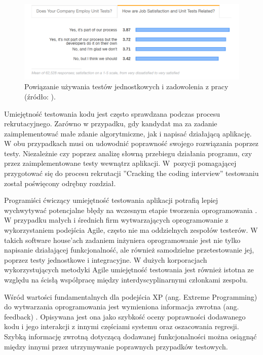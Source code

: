 \begin{figure}[h]
    \centering
    \includegraphics[width = 13cm]{chapter02/unit-tests-satisfaction.png}
    \caption{Powiązanie używania testów jednostkowych i zadowolenia z pracy (źródło: \cite{stack-overflow-survey}).}
    \label{fig:unit-tests-satisfaction}
\end{figure}

Umiejętność testowania kodu jest często sprawdzana podczas procesu rekrutacyjnego.
Zarówno w przypadku, gdy kandydat ma za zadanie zaimplementować małe zdanie algorytmiczne, jak i napisać działającą aplikację.
W obu przypadkach musi on udowodnić poprawność swojego rozwiązania poprzez testy. 
Niezależnie czy poprzez analizę słowną przebiegu działania programu, czy przez zaimplementowane testy wewnątrz aplikacji.
W~pozycji pomagającej przygotować się do procesu rekrutacji ”Cracking the coding interview” \cite{cracking-the-coding-interview} testowaniu został poświęcony odrębny rozdział.

Programiści ćwiczący umiejętność testowania aplikacji potrafią lepiej wychwytywać potencjalne błędy na wczesnym etapie tworzenia oprogramowania \cite{testing-better-error-catch}.
W przypadku małych i średnich firm wytwarzających oprogramowanie z wykorzystaniem podejścia Agile, często nie ma oddzielnych zespołów testerów.
W takich software house'ach zadaniem inżyniera oprogramowanie jest nie tylko napisanie działającej funkcjonalność, ale również samodzielne przetestowanie jej, poprzez testy jednostkowe i integracyjne.
W dużych korporacjach wykorzystujących metodyki Agile umiejętność testowania jest również istotna ze względu na ścisłą współpracę między interdyscyplinarnymi członkami zespołu.

Wśród wartości fundamentalnych dla podejścia XP (ang. Extreme Programming) do wytwarzania oprogramowania jest wymieniona informacja zwrotna (ang. feedback) \cite{extreem-programming}.
Opisywana jest ona jako szybkość oceny poprawności dodawanego kodu i jego interakcji z innymi częściami systemu oraz oszacowania regresji.
Szybką informację zwrotną dotyczącą dodawanej funkcjonalności można osiągnąć między innymi przez utrzymywanie poprawnych przypadków testowych.

